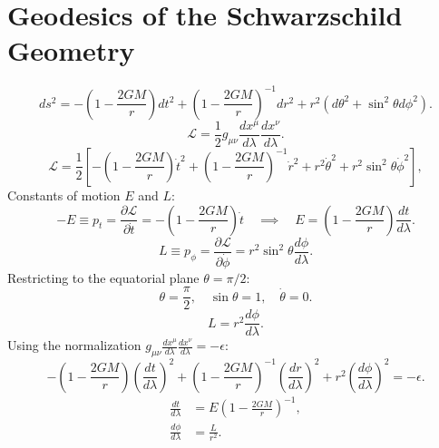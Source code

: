 \documentclass[11pt, a4paper]{report}
\begin{document}
\section{Geodesics of the Schwarzschild Geometry}
\begin{equation}
\label{eq:schwarzschild_metric_geodesic}
ds^{2} = -\left(1-\frac{2GM}{r}\right)dt^{2} + \left(1-\frac{2GM}{r}\right)^{-1}dr^{2} + r^{2}(d\theta^{2} + \sin^{2}\theta d\phi^{2}).
\end{equation}
\begin{equation}
\mathcal{L} = \frac{1}{2} g_{\mu\nu} \frac{dx^{\mu}}{d\lambda} \frac{dx^{\nu}}{d\lambda}.
\end{equation}
\begin{equation}
\label{eq:schwarz_lagrangian}
\mathcal{L} = \frac{1}{2} \left[ -\left(1-\frac{2GM}{r}\right)\dot{t}^{2} + \left(1-\frac{2GM}{r}\right)^{-1}\dot{r}^{2} + r^{2}\dot{\theta}^{2} + r^{2}\sin^{2}\theta \dot{\phi}^{2} \right],
\end{equation}
Constants of motion $E$ and $L$:
\begin{equation}
\label{eq:energy_conserved}
-E \equiv p_{t} = \frac{\partial \mathcal{L}}{\partial \dot{t}} = -\left(1-\frac{2GM}{r}\right)\dot{t} \quad \implies \quad E = \left(1-\frac{2GM}{r}\right)\frac{dt}{d\lambda}.
\end{equation}
\begin{equation}
\label{eq:angular_conserved}
L \equiv p_{\phi} = \frac{\partial \mathcal{L}}{\partial \dot{\phi}} = r^{2}\sin^{2}\theta \frac{d\phi}{d\lambda}.
\end{equation}
Restricting to the equatorial plane $\theta = \pi/2$:
\begin{equation}
\theta = \frac{\pi}{2}, \quad \sin\theta = 1, \quad \dot{\theta} = 0.
\end{equation}
\begin{equation}
L = r^{2} \frac{d\phi}{d\lambda}.
\end{equation}
Using the normalization $g_{\mu\nu}\frac{dx^{\mu}}{d\lambda}\frac{dx^{\nu}}{d\lambda} = -\epsilon$:
\begin{equation}
\label{eq:normalization_expanded}
-\left(1-\frac{2GM}{r}\right)\left(\frac{dt}{d\lambda}\right)^{2} + \left(1-\frac{2GM}{r}\right)^{-1}\left(\frac{dr}{d\lambda}\right)^{2} + r^{2}\left(\frac{d\phi}{d\lambda}\right)^{2} = -\epsilon.
\end{equation}
\begin{align}
\frac{dt}{d\lambda} &= E \left(1-\frac{2GM}{r}\right)^{-1}, \\
\frac{d\phi}{d\lambda} &= \frac{L}{r^{2}}.
\end{align}
\end{document}
